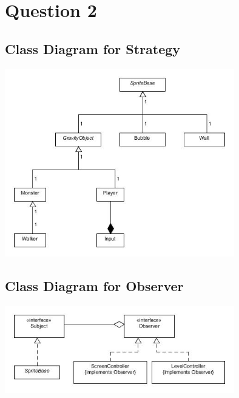 \section{Question 2}

\subsection{Class Diagram for Strategy}

\includegraphics[width=100mm]{classDiagramStrategy.jpg}

\subsection{Class Diagram for Observer}

\includegraphics[width=100mm]{classDiagramObserver.jpg}
